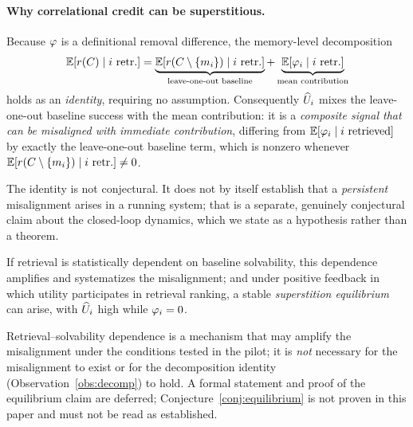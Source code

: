 \paragraph{Why correlational credit can be superstitious.}
\begin{observation}\label{obs:decomp}
Because $\varphi$ is a definitional removal difference, the memory-level
decomposition
\begin{equation}
\mathbb{E}[r(C)\mid i\text{ retr.}] =
  \underbrace{\mathbb{E}[r(C\setminus\{m_i\})\mid i\text{ retr.}]}_{\text{leave-one-out baseline}}
  + \underbrace{\mathbb{E}[\varphi_i\mid i\text{ retr.}]}_{\text{mean contribution}}
\end{equation}
holds as an \emph{identity}, requiring no assumption. Consequently $\widehat{U}_i$ mixes
the leave-one-out baseline success with the mean contribution: it is a
\emph{composite signal that can be misaligned with immediate contribution},
differing from $\mathbb{E}[\varphi_i\mid i\text{ retrieved}]$ by exactly the leave-one-out
baseline term, which is nonzero whenever
$\mathbb{E}[r(C\setminus\{m_i\})\mid i\text{ retr.}]\neq 0$.
\end{observation}

\noindent The identity is not conjectural. It does not by itself establish that a
\emph{persistent} misalignment arises in a running system; that is a separate,
genuinely conjectural claim about the closed-loop dynamics, which we state as a
hypothesis rather than a theorem.

\begin{conjecture}\label{conj:equilibrium}
If retrieval is statistically dependent on baseline solvability, this dependence
amplifies and systematizes the misalignment; and under positive feedback in which
utility participates in retrieval ranking, a stable \emph{superstition equilibrium}
can arise, with $\widehat{U}_i$ high while $\varphi_i = 0$.
\end{conjecture}

\noindent Retrieval--solvability dependence is a mechanism that may amplify the
misalignment under the conditions tested in the pilot; it is \emph{not} necessary
for the misalignment to exist or for the decomposition identity
(Observation~\ref{obs:decomp}) to hold. A formal statement and proof of the
equilibrium claim are deferred; Conjecture~\ref{conj:equilibrium} is not proven in
this paper and must not be read as established.

